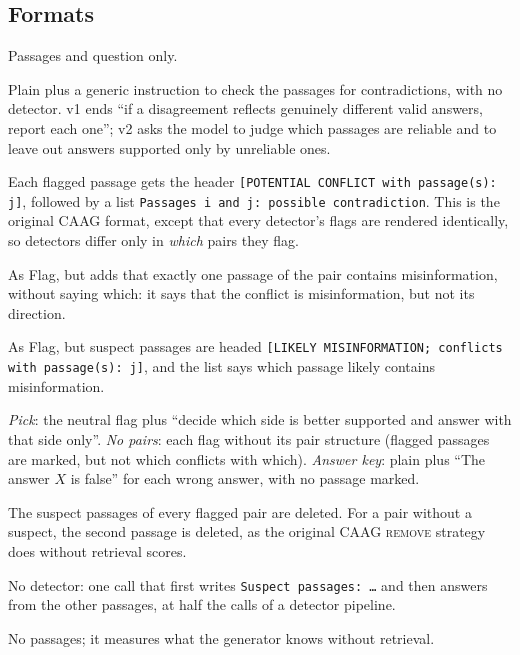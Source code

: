 \subsection{Formats}
\label{sec:formats}
\begin{description}[leftmargin=0pt,itemsep=1pt,topsep=2pt]
\item[No flags (plain).] Passages and question only.
\item[Instruction.] Plain plus a generic instruction to check the passages for contradictions, with no detector.
v1 ends ``if a disagreement reflects genuinely different valid answers, report each one''; v2 asks the model to
judge which passages are reliable and to leave out answers supported only by unreliable ones.
\item[Flag.] Each flagged passage gets the header \texttt{[POTENTIAL CONFLICT with passage(s): j]}, followed by a list
\texttt{Passages i and j: possible contradiction}. This is the original CAAG format, except that every detector's
flags are rendered identically, so detectors differ only in \emph{which} pairs they flag.
\item[One-wrong flag.] As Flag, but adds that exactly one passage of the pair contains misinformation, without saying
which: it says that the conflict is misinformation, but not its direction.
\item[Directional flag.] As Flag, but suspect passages are headed \texttt{[LIKELY MISINFORMATION; conflicts with
passage(s): j]}, and the list says which passage likely contains misinformation.
\item[Controls.] \emph{Pick}: the neutral flag plus ``decide which side is better supported and answer with that
side only''. \emph{No pairs}: each flag without its pair structure (flagged passages are marked, but not which conflicts
with which). \emph{Answer key}: plain plus ``The answer $X$ is false'' for each wrong answer, with no passage marked.
\item[Remove (suspect).] The suspect passages of every flagged pair are deleted. For a pair without a suspect, the
second passage is deleted, as the original CAAG \textsc{remove} strategy does without retrieval scores.
\item[Single call.] No detector: one call that first writes \texttt{Suspect passages: \dots} and then answers from
the other passages, at half the calls of a detector pipeline.
\item[Closed book.] No passages; it measures what the generator knows without retrieval.
\end{description}

